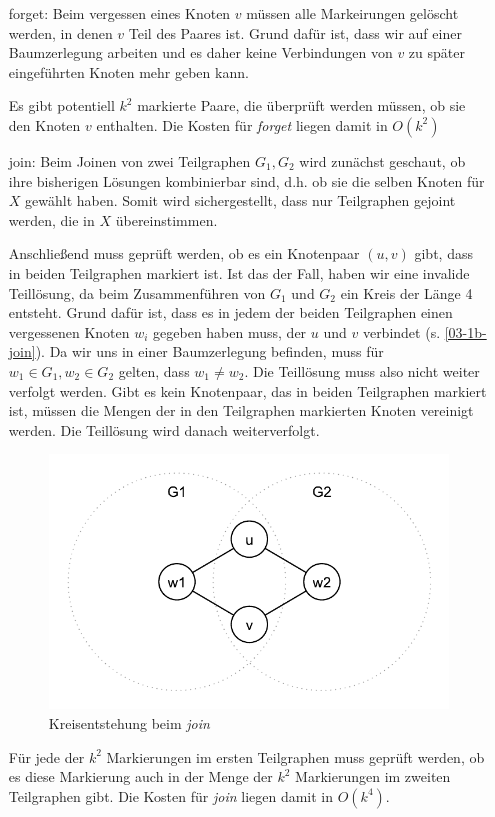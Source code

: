 \begin{itemize}
\item[forget: ]Beim vergessen eines Knoten $v$ müssen alle Markeirungen gelöscht werden, in denen $v$ Teil des Paares ist. Grund dafür ist, dass wir auf einer Baumzerlegung arbeiten und es daher keine Verbindungen von $v$ zu später eingeführten Knoten mehr geben kann.

Es gibt potentiell $k^2$ markierte Paare, die überprüft werden müssen, ob sie den Knoten $v$ enthalten. Die Kosten für \textit{forget} liegen damit in $O(k^2)$

\item[join: ] Beim Joinen von zwei Teilgraphen $G_1, G_2$ wird zunächst geschaut, ob ihre bisherigen Lösungen kombinierbar sind, d.h. ob sie die selben Knoten für $X$ gewählt haben. Somit wird sichergestellt, dass nur Teilgraphen gejoint werden, die in $X$ übereinstimmen.

Anschließend muss geprüft werden, ob es ein Knotenpaar $(u,v)$ gibt, dass in beiden Teilgraphen markiert ist. Ist das der Fall, haben wir eine invalide Teillösung, da beim Zusammenführen von $G_1$ und $G_2$ ein Kreis der Länge 4 entsteht. Grund dafür ist, dass es in jedem der beiden Teilgraphen einen vergessenen Knoten $w_i$ gegeben haben muss, der $u$ und $v$ verbindet (s. \autoref{03-1b-join}). Da wir uns in einer Baumzerlegung befinden, muss für $w_1\in G_1, w_2\in G_2$ gelten, dass $w_1\neq w_2$. Die Teillösung muss also nicht weiter verfolgt werden. Gibt es kein Knotenpaar, das in beiden Teilgraphen markiert ist, müssen die Mengen der in den Teilgraphen markierten Knoten vereinigt werden. Die Teillösung wird danach weiterverfolgt.

\begin{figure}[h]
	\center		
	\includegraphics[scale=0.5]{fig/03-1b-join}
	\caption{Kreisentstehung beim \textit{join}}
	\label{03-1b-join}
\end{figure}

Für jede der $k^2$ Markierungen im ersten Teilgraphen muss geprüft werden, ob es diese Markierung auch in der Menge der $k^2$ Markierungen im zweiten Teilgraphen gibt. Die Kosten für \textit{join} liegen damit in $O(k^4)$.
\end{itemize}


